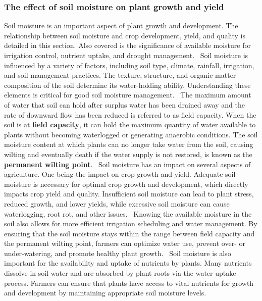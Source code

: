\documentclass[11pt]{scrartcl} %
\begin{document}
\subsubsection{The effect of soil moisture on plant growth and yield}
Soil moisture is an important aspect of plant growth and development. The relationship between soil moisture and crop development, yield, and quality is detailed in this section. Also covered is the significance of available moisture for irrigation control, nutrient uptake, and drought management.~\parencite{soil_moisture_plant_water}
\newline Soil moisture is influenced by a variety of factors, including soil type, climate, rainfall, irrigation, and soil management practices. The texture, structure, and organic matter composition of the soil determine its water-holding ability. Understanding these elements is critical for good soil moisture management.~\parencite{soil_moisture_plant_water}
\newline The maximum amount of water that soil can hold after surplus water has been drained away and the rate of downward flow has been reduced is referred to as field capacity. When the soil is at \textbf{field capacity}, it can hold the maximum quantity of water available to plants without becoming waterlogged or generating anaerobic conditions. The soil moisture content at which plants can no longer take water from the soil, causing wilting and eventually death if the water supply is not restored, is known as the \textbf{permanent wilting point}.~\parencite{soil_moisture_plant_water}
\newline Soil moisture has an impact on several aspects of agriculture. One being the impact on crop growth and yield. Adequate soil moisture is necessary for optimal crop growth and development, which directly impacts crop yield and quality. Insufficient soil moisture can lead to plant stress, reduced growth, and lower yields, while excessive soil moisture can cause waterlogging, root rot, and other issues.~\parencite{soil_moisture_plant_water}
\newline Knowing the available moisture in the soil also allows for more efficient irrigation scheduling and water management. By ensuring that the soil moisture stays within the range between field capacity and the permanent wilting point, farmers can optimize water use, prevent over- or under-watering, and promote healthy plant growth.~\parencite{soil_moisture_plant_water}
\newline Soil moisture is also important for the availability and uptake of nutrients by plants. Many nutrients dissolve in soil water and are absorbed by plant roots via the water uptake process. Farmers can ensure that plants have access to vital nutrients for growth and development by maintaining appropriate soil moisture levels.~\parencite{soil_moisture_plant_water}
\end{document}
